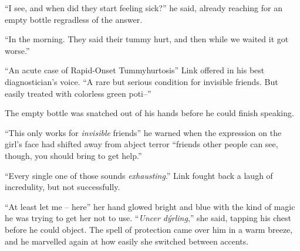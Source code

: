\documentclass[../FGP.tex]{subfiles}
\begin{document}
\begin{fragment}
``I see, and when did they start feeling sick?'' he said, already reaching for an empty bottle regradless of the answer. 

``In the morning. They said their tummy hurt, and then while we waited it got worse.''



``An acute case of Rapid-Onset Tummyhurtosis'' Link offered in his best diagnostician's voice. ``A rare but serious condition for invisible friends. But easily treated with colorless green poti--''

The empty bottle was snatched out of his hands before he could finish speaking. 

``This only works for \emph{invisible} friends'' he warned when the expression on the girl's face had shifted away from abject terror ``friends other people can see, though, you should bring to get help.'' 
\end{fragment}

\begin{fragment}



``Every single one of those sounds \emph{exhausting}.'' Link fought back a laugh of incredulity, but not successfully. 

``At least let me -- here'' her hand glowed bright and blue with the kind of magic he was trying to get her not to use. ``\emph{Uncer dýrling},'' she said, tapping his chest before he could object. The spell of protection came over him in a warm breeze, and he marvelled again at how easily she switched between accents.
\end{fragment}
\end{document}
